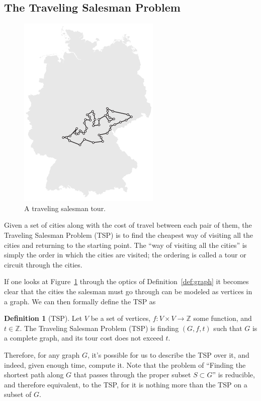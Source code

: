 \documentclass[11pt,letterpaper]{article}
\theoremstyle{definition}
\newtheorem{defn}{Definition}[section]
\begin{document}
\subsection{The Traveling Salesman Problem}\label{sub:tsp}
\begin{figure}
    \centering
    \includegraphics{./TSP.png}
    \caption{A traveling salesman tour.\protect\footnotemark[21]}\label{fig:TSP}
\end{figure}
Given a set of cities along with the cost of travel between each pair of them, the Traveling Salesman Problem (TSP) is to find the cheapest way of visiting all the cities and returning to the starting point. The ``way of visiting all the cities'' is simply the order in which the cities are visited; the ordering is called a tour or circuit through the cities.\autocite{applegate_2007}

If one looks at Figure~\ref{fig:TSP} through the optics of Definition~\ref{def:graph} it becomes clear that the cities the salesman must go through can be modeled as vertices in a graph. We can then formally define the TSP as

\begin{defn}[TSP]\label{def:TSP}
    Let \(V\) be a set of vertices, \(f\colon V\times V \to \mathbb Z\) some function, and \(t\in \mathbb Z\). The Traveling Salesman Problem (TSP) is finding \((G, f, t)\) such that \(G\) is a complete graph, and its tour cost does not exceed \(t\).
\end{defn}

Therefore, for any graph \(G\), it's possible for us to describe the TSP over it, and indeed, given enough time, compute it. Note that the problem of ``Finding the shortest path along \(G\) that passes through the proper subset \(S\subset G\)'' is reducible, and therefore equivalent, to the TSP, for it is nothing more than the TSP on a subset of \(G\).
\end{document}
